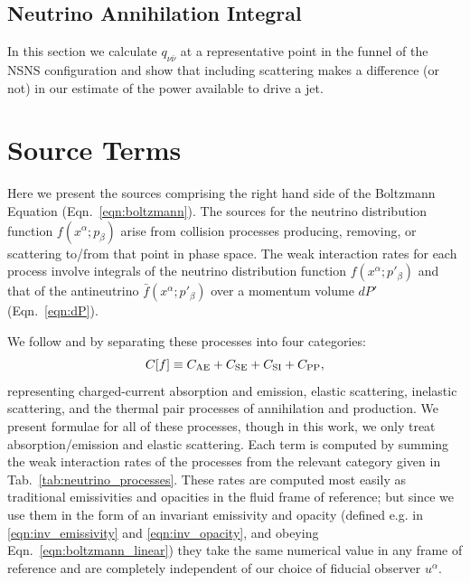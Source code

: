 \documentclass[aps,floatfix,prd,superscriptaddress,twocolumn]{revtex4-1}
\newcommand{\todo}[1]{\marginpar{\tiny{\textcolor{red}{#1}}}}
\begin{document}
\subsection{Neutrino Annihilation Integral}
\label{ssec:q_nunu}
In this section we calculate $q_{\nu\bar{\nu}}$ at a representative point
in the funnel of the NSNS configuration and show that including scattering makes
a difference (or not) in our estimate of the power available to drive a jet.

\appendix

\section{Source Terms}
\label{sec:source_terms}
Here we present the sources comprising the right hand side of the
Boltzmann Equation (Eqn.~\ref{eqn:boltzmann}). The sources for the neutrino
distribution function $f(x^\alpha;p_\beta)$ arise from collision processes
producing, removing, or scattering to/from that point in phase space.
The weak interaction rates for each process involve integrals of
the neutrino distribution function $f(x^\alpha;p'_\beta)$ and that of the
antineutrino $\bar{f}(x^\alpha;p'_\beta)$ over a momentum volume
$dP'$ (Eqn.~\ref{eqn:dP}).

We follow
\cite{brue1985-core_collapse} and \cite[Sec.~4]{shib2011-truncated_moment}
by separating these processes into four categories:
\begin{equation}
  \label{eqn:four_sources}
  C[f] \equiv C_{\rm AE} + C_{\rm SE} + C_{\rm SI} + C_{\rm PP},
\end{equation}
representing charged-current absorption and emission, elastic scattering,
inelastic scattering, and the thermal pair processes of annihilation and
production.
We present formulae for all of these processes, though in this work, we only
treat absorption/emission and elastic scattering.
Each term
is computed by summing the weak interaction rates of the processes from the
relevant category given in Tab.~\ref{tab:neutrino_processes}.
These rates are computed most easily as traditional emissivities and opacities
in the fluid frame of reference;
but since we use them in the form of an invariant emissivity and opacity
(defined e.g. in \ref{eqn:inv_emissivity} and \ref{eqn:inv_opacity},
and obeying Eqn.~\ref{eqn:boltzmann_linear})
they take the same numerical value in any frame of reference
and are completely independent of our choice of fiducial observer $u^\alpha$.
\todo{confirm}
\end{document}
